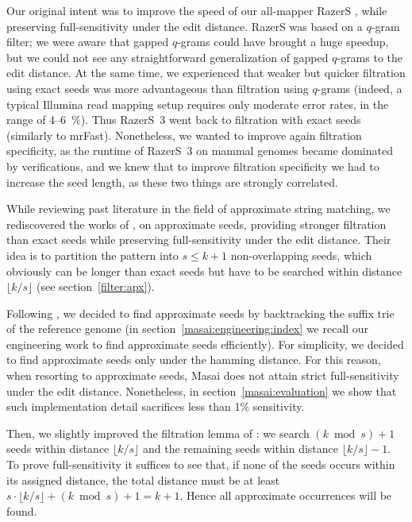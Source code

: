 
Our original intent was to improve the speed of our all-mapper RazerS \citep{Weese2009}, while preserving full-sensitivity under the edit distance.
RazerS was based on a $q$-gram filter;
we were aware that gapped $q$-grams could have brought a huge speedup, but we could not see any straightforward generalization of gapped $q$-grams to the edit distance.
At the same time, we experienced that weaker but quicker filtration using exact seeds was more advantageous than filtration using $q$-grams (indeed, a typical Illumina read mapping setup requires only moderate error rates, in the range of 4--6~\%).
Thus RazerS~3 \citep{RazerS3} went back to filtration with exact seeds (similarly to mrFast).
Nonetheless, we wanted to improve again filtration specificity, as the runtime of RazerS~3 on mammal genomes became dominated by verifications, and we knew that to improve filtration specificity we had to increase the seed length, as these two things are strongly correlated.

While reviewing past literature in the field of approximate string matching, we rediscovered the works of \citeauthor{Myers1994}, \citeauthor{Navarro2000} on approximate seeds, providing stronger filtration than exact seeds while preserving full-sensitivity under the edit distance.
Their idea is to partition the pattern into $s \leq k+1$ non-overlapping seeds, which obviously can be longer than exact seeds but have to be searched within distance $\lfloor k/s \rfloor$ (see section~\ref{filter:apx}).

Following \citep{Navarro2000}, we decided to find approximate seeds by backtracking the suffix trie of the reference genome (in section~\ref{masai:engineering:index} we recall our engineering work to find approximate seeds efficiently).
For simplicity, we decided to find approximate seeds only under the hamming distance.
For this reason, when resorting to approximate seeds, Masai does not attain strict full-sensitivity under the edit distance.
Nonetheless, in section~\ref{masai:evaluation} we show that such implementation detail sacrifices less than 1\% sensitivity.

Then, we slightly improved the filtration lemma of \citep{Navarro2000}:
we search $(k \bmod{s}) + 1$ seeds within distance $\lfloor k/s \rfloor$ and the remaining seeds within distance $\lfloor k/s \rfloor - 1$.
To prove full-sensitivity it suffices to see that, if none of the seeds occurs within its assigned distance, the total distance must be at least $s \cdot \lfloor k/s \rfloor + (k \bmod s) + 1 = k + 1$.
Hence all approximate occurrences will be found.

